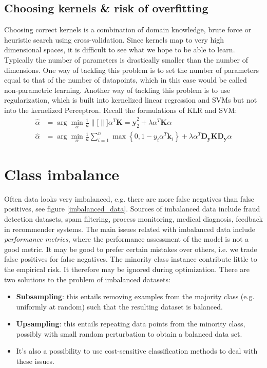 \documentclass[a4paper,10pt,twoside]{article}
\newcommand\norm[1]{\left\lVert#1\right\rVert}
\begin{document}
\subsection{Choosing kernels \& risk of overfitting}

Choosing correct kernels is a combination of domain knowledge, brute force or heuristic search using cross-validation. Since kernels map to very high dimensional spaces, it is difficult to see what we hope to be able to learn. Typically the number of parameters is drastically smaller than the number of dimensions. One way of tackling this problem is to set the number of parameters equal to that of the number of datapoints, which in this case would be called non-parametric learning. Another way of tackling this problem is to use regularization, which is built into kernelized linear regression and SVMs but not into the kernelized Perceptron. Recall the formulations of KLR and SVM:
\begin{align*}
    \hat{\alpha} &= \arg\min_{\alpha}\frac{1}{n}\norm[]{\alpha^T\mathbf{K}=\mathbf{y}}_2^2+\lambda\alpha^T\mathbf{K}\alpha\\
    \hat{\alpha} &= \arg\min_{\alpha}\frac{1}{n}\sum_{i=1}^{n}\max\left\{0,1-y_i\alpha^T\mathbf{k}_i\right\} + \lambda\alpha^T\mathbf{D}_{\mathbf{y}}\mathbf{K}\mathbf{D}_\mathbf{y}\alpha
\end{align*}

\section{Class imbalance}

Often data looks very imbalanced, e.g. there are more false negatives than false positives, see figure \ref{imbalanced_data}. Sources of imbalanced data include fraud detection datasets, spam filtering, process monitoring, medical diagnosis, feedback in recommender systems. The main issues related with imbalanced data include \textit{performance metrics}, where the performance assessment of the model is not a good metric. It may be good to prefer certain mistakes over others, i.e. we trade false positives for false negatives. The minority class instance contribute little to the empirical risk. It therefore may be ignored during optimization. There are two solutions to the problem of imbalanced datasets:
\begin{itemize}
    \item \textbf{Subsampling}: this entails removing examples from the majority class (e.g. uniformly at random) such that the resulting dataset is balanced. 
    \item \textbf{Upsampling}: this entails repeating data points from the minority class, possibly with small random perturbation to obtain a balanced data set.
    \item It's also a possibility to use cost-sensitive classification methods to deal with these issues.
\end{itemize}
\end{document}
